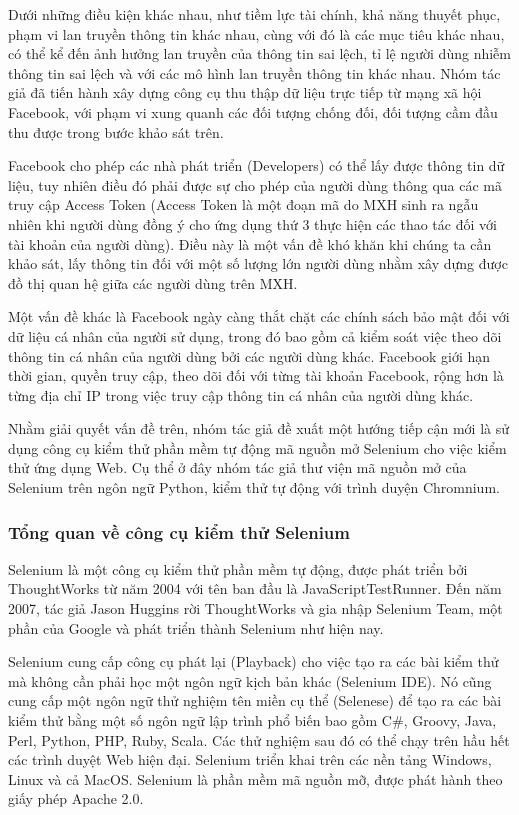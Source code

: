 Dưới những điều kiện khác nhau, như tiềm lực tài chính, khả năng thuyết phục, phạm vi lan truyền thông tin khác nhau, cùng với đó là các mục tiêu khác nhau, có thể kể đến ảnh hưởng lan truyền của thông tin sai lệch, tỉ lệ người dùng nhiễm thông tin sai lệch và với các mô hình lan truyền thông tin khác nhau. Nhóm tác giả đã tiến hành xây dựng công cụ thu thập dữ liệu trực tiếp từ mạng xã hội Facebook, với phạm vi xung quanh các đối tượng chống đối, đối tượng cầm đầu thu được trong bước khảo sát trên.

Facebook cho phép các nhà phát triển (Developers) có thể lấy được thông tin dữ liệu, tuy nhiên điều đó phải được sự cho phép của người dùng thông qua các mã truy cập Access Token (Access Token là một đoạn mã do MXH sinh ra ngẫu nhiên khi người dùng đồng ý cho ứng dụng thứ 3 thực hiện các thao tác đối với tài khoản của người dùng). Điều này là một vấn đề khó khăn khi chúng ta cần khảo sát, lấy thông tin đối với một số lượng lớn người dùng nhằm xây dựng được đồ thị quan hệ giữa các người dùng trên MXH.

Một vấn đề khác là Facebook ngày càng thắt chặt các chính sách bảo mật đối với dữ liệu cá nhân của người sử dụng, trong đó bao gồm cả kiểm soát việc theo dõi thông tin cá nhân của người dùng bởi các người dùng khác. Facebook giới hạn thời gian, quyền truy cập, theo dõi đối với từng tài khoản Facebook, rộng hơn là từng địa chỉ IP trong việc truy cập thông tin cá nhân của người dùng khác.

Nhằm giải quyết vấn đề trên, nhóm tác giả đề xuất một hướng tiếp cận mới là sử dụng công cụ kiểm thử phần mềm tự động mã nguồn mở Selenium cho việc kiểm thử ứng dụng Web. Cụ thể ở đây nhóm tác giả thư viện mã nguồn mở của Selenium trên ngôn ngữ Python, kiểm thử tự động với trình duyện Chromnium.

	\subsubsection{Tổng quan về công cụ kiểm thử Selenium}
Selenium là một công cụ kiểm thử phần mềm tự động, được phát triển bởi ThoughtWorks từ năm 2004 với tên ban đầu là JavaScriptTestRunner. Đến năm 2007, tác giả Jason Huggins rời ThoughtWorks và gia nhập Selenium Team, một phần của Google và phát triển thành Selenium như hiện nay.

Selenium cung cấp công cụ phát lại (Playback) cho việc tạo ra các bài kiểm thử mà không cần phải học một ngôn ngữ kịch bản khác (Selenium IDE). Nó cũng cung cấp một ngôn ngữ thử nghiệm tên miền cụ thể (Selenese) để tạo ra các bài kiểm thử bằng một số ngôn ngữ lập trình phổ biến bao gồm C\#, Groovy, Java, Perl, Python, PHP, Ruby, Scala. Các thử nghiệm sau đó có thể chạy trên hầu hết các trình duyệt Web hiện đại. Selenium triển khai trên các nền tảng Windows, Linux và cả MacOS. Selenium là phần mềm mã nguồn mỡ, được phát hành theo giấy phép Apache 2.0.

